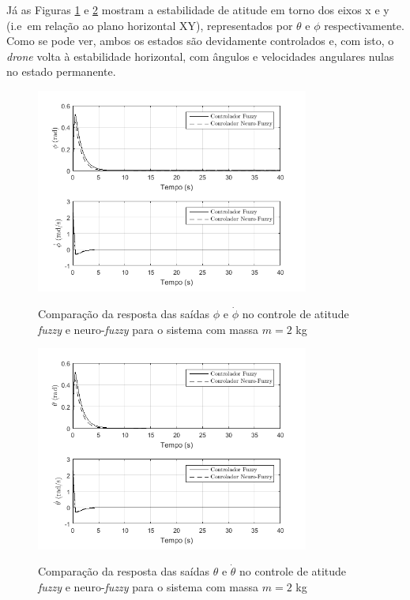 Já as Figuras \ref{fig:atitude_phi_phidot_2kg_40s} e \ref{fig:atitude_theta_thetadot_2kg_40s} mostram a estabilidade de atitude em torno dos eixos x e y (i.e\ em relação ao plano horizontal XY), representados por $\theta$ e $\phi$ respectivamente. Como se pode ver, ambos os estados são devidamente controlados e, com isto, o \textit{drone} volta à estabilidade horizontal, com ângulos e velocidades angulares nulas no estado permanente.

\begin{figure}[!htb]
    \centering
    \caption{Comparação da resposta das saídas $\phi$ e $\dot{\phi}$ no controle de atitude \textit{fuzzy} e neuro-\textit{fuzzy} para o sistema com massa $m=2$ kg}
    \includegraphics[width=0.8\textwidth]{./04-figuras/resultados/novos/atitude_phi_phidot_2kg_40s}
    \label{fig:atitude_phi_phidot_2kg_40s}
\end{figure}

\begin{figure}[!htb]
    \centering
    \caption{Comparação da resposta das saídas $\theta$ e $\dot{\theta}$ no controle de atitude \textit{fuzzy} e neuro-\textit{fuzzy} para o sistema com massa $m=2$ kg}
    \includegraphics[width=0.8\textwidth]{./04-figuras/resultados/novos/atitude_theta_thetadot_2kg_40s}
    \label{fig:atitude_theta_thetadot_2kg_40s}
\end{figure}

